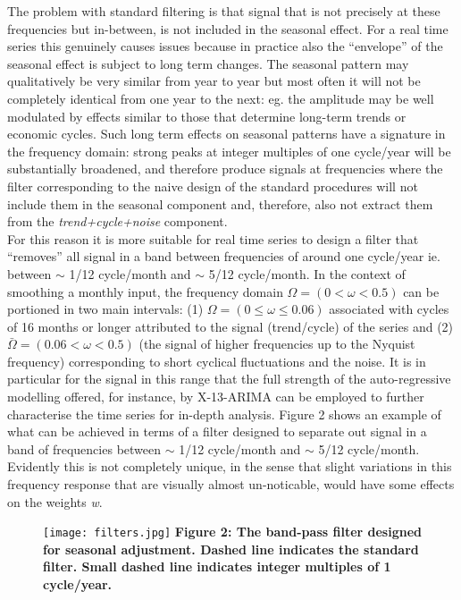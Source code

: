 \documentclass{article}
\begin{document}
The problem with standard filtering is that signal that is not precisely at these frequencies but in-between, is not included in the seasonal effect. For a real time series this genuinely causes issues because in practice also the ``envelope'' of the seasonal effect is subject to long term changes. The seasonal pattern may qualitatively be very similar from year to year but most often it will not be completely identical from one year to the next: eg. the amplitude may be well modulated by effects similar to those that determine long-term trends or economic cycles. Such long term effects on seasonal patterns have a signature in the frequency domain: strong peaks at integer multiples of one cycle/year will be substantially broadened, and therefore produce signals at frequencies where the filter corresponding to the naive design of the standard procedures will not include them in the seasonal component and, therefore, also not extract them from the \textit{trend+cycle+noise} component.\\For this reason it is more suitable for real time series to design a filter that ``removes'' all signal in a band between frequencies of around one cycle/year ie. between $\sim$ 1/12 cycle/month and $\sim$ 5/12 cycle/month. In the context of smoothing a monthly input, the frequency domain $\Omega=(0<\omega<0.5)$ can be portioned in two main intervals: (1) $\Omega=(0 \leq \omega \leq 0.06)$ associated with cycles of 16 months or longer attributed to the signal (trend/cycle) of the series and (2) $\bar{\Omega}=(0.06 < \omega < 0.5)$ (the signal of higher frequencies up to the Nyquist frequency) corresponding to short cyclical fluctuations and the noise. It is in particular for the signal in this range that the full strength of the auto-regressive modelling offered, for instance, by X-13-ARIMA can be employed to further characterise the time series for in-depth analysis. Figure 2 shows an example of what can be achieved in terms of a filter designed to separate out signal in a band of frequencies between $\sim$ 1/12 cycle/month and $\sim$ 5/12 cycle/month. Evidently this is not completely unique, in the sense that slight variations in this frequency response that are visually almost un-noticable, would have some effects on the weights \textit{w}.
\begin{figure}[H]
  \texttt{[image: filters.jpg]}
 {\textbf{\scriptsize Figure 2: The band-pass filter designed for seasonal adjustment. Dashed line indicates the standard filter. Small dashed line indicates integer multiples of 1 cycle/year.}}
\end{figure}
\end{document}
